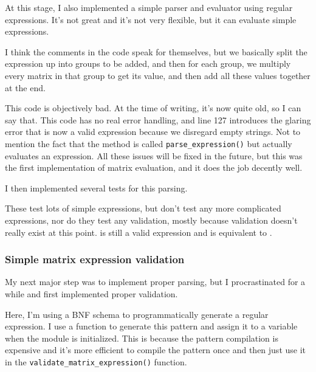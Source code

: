 \documentclass[../main.tex]{subfiles}
\begin{document}
At this stage, I also implemented a simple parser and evaluator using regular expressions. It's not great and it's not very flexible, but it can evaluate simple expressions.


I think the comments in the code speak for themselves, but we basically split the expression up into groups to be added, and then for each group, we multiply every matrix in that group to get its value, and then add all these values together at the end.

This code is objectively bad. At the time of writing, it's now quite old, so I can say that. This code has no real error handling, and line 127 introduces the glaring error that  is now a valid expression because we disregard empty strings. Not to mention the fact that the method is called \texttt{parse\_expression()} but actually evaluates an expression. All these issues will be fixed in the future, but this was the first implementation of matrix evaluation, and it does the job decently well.

I then implemented several tests for this parsing.


These test lots of simple expressions, but don't test any more complicated expressions, nor do they test any validation, mostly because validation doesn't really exist at this point.  is still a valid expression and is equivalent to .

\subsubsection{Simple matrix expression validation\label{development:matrices-backend:simple-matrix-expression-validation}}

My next major step was to implement proper parsing, but I procrastinated for a while and first implemented proper validation.


Here, I'm using a BNF schema to programmatically generate a regular expression. I use a function to generate this pattern and assign it to a variable when the module is initialized. This is because the pattern compilation is expensive and it's more efficient to compile the pattern once and then just use it in the \texttt{validate\_matrix\_expression()} function.
\end{document}
